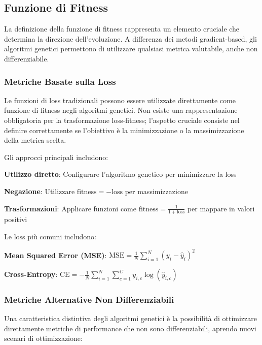 \subsection{Funzione di Fitness}
La definizione della funzione di fitness rappresenta un elemento cruciale che determina la direzione dell'evoluzione. A differenza dei metodi gradient-based, gli algoritmi genetici permettono di utilizzare qualsiasi metrica valutabile, anche non differenziabile.
\subsubsection{Metriche Basate sulla Loss}
Le funzioni di loss tradizionali possono essere utilizzate direttamente come funzione di fitness negli algoritmi genetici. Non esiste una rappresentazione obbligatoria per la trasformazione loss-fitness; l'aspetto cruciale consiste nel definire correttamente se l'obiettivo è la minimizzazione o la massimizzazione della metrica scelta.

Gli approcci principali includono:
\begin{compactitemize}
\item \textbf{Utilizzo diretto}: Configurare l'algoritmo genetico per minimizzare la loss
\item \textbf{Negazione}: Utilizzare $\text{fitness} = -\text{loss}$ per massimizzazione
\item \textbf{Trasformazioni}: Applicare funzioni come $\text{fitness} = \frac{1}{1 + \text{loss}}$ per mappare in valori positivi
\end{compactitemize}

Le loss più comuni includono:
\begin{compactitemize}
\item \textbf{Mean Squared Error (MSE)}: $\text{MSE} = \frac{1}{N}\sum_{i=1}^{N}(y_i - \hat{y}_i)^2$
\item \textbf{Cross-Entropy}: $\text{CE} = -\frac{1}{N}\sum_{i=1}^{N}\sum_{c=1}^{C}y_{i,c}\log(\hat{y}_{i,c})$
\end{compactitemize}

\subsubsection{Metriche Alternative Non Differenziabili}
Una caratteristica distintiva degli algoritmi genetici è la possibilità di ottimizzare direttamente metriche di performance che non sono differenziabili, aprendo nuovi scenari di ottimizzazione:


